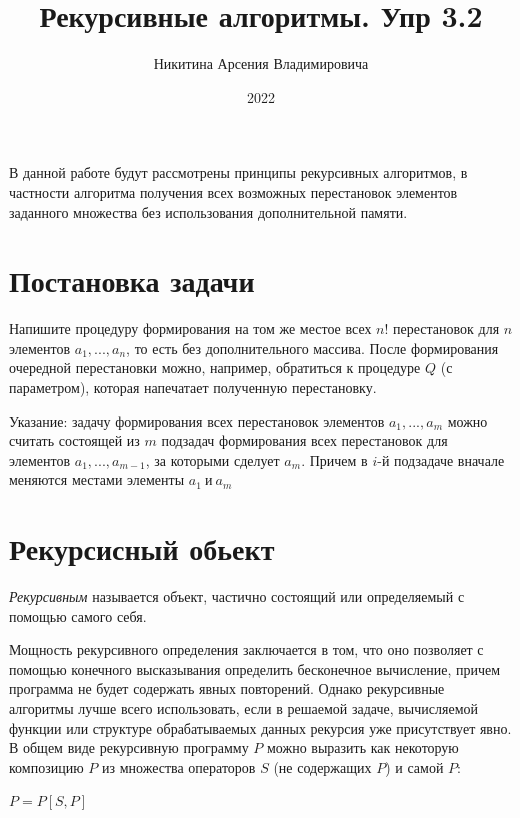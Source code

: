 \documentclass[bachelor, och, labwork]{shiza}
\begin{document}

\title{Рекурсивные алгоритмы. Упр 3.2}





\author{Никитина Арсения Владимировича}



\date{2022}

\maketitle

\tableofcontents

\intro
В данной работе будут рассмотрены принципы рекурсивных алгоритмов, в частности
алгоритма получения всех возможных перестановок элементов заданного множества
без использования дополнительной памяти.

\section{Постановка задачи}
Напишите процедуру формирования на том же местое всех $n!$ перестановок для $n$
элементов $a_1,...,a_n$, то есть без дополнительного массива. После формирования
очередной перестановки можно, например, обратиться к процедуре $Q$ (с параметром),
которая напечатает полученную перестановку.

Указание: задачу формирования всех перестановок элементов $a_1,...,a_m$ можно
считать состоящей из $m$ подзадач формирования всех перестановок для элементов
$a_1,...,a_{m-1}$, за которыми сделует $a_m$. Причем в $i$-й подзадаче вначале
меняются местами элементы $a_1 ~\text{и}~ a_m$

\section{Рекурсисный обьект}

\textit{Рекурсивным} называется объект, частично состоящий или определяемый с
помощью самого себя.

Мощность рекурсивного определения заключается в том, что оно позволяет с помощью
конечного высказывания определить бесконечное вычисление, причем программа не 
будет содержать явных повторений. Однако рекурсивные алгоритмы лучше всего
использовать, если в решаемой задаче, вычисляемой функции или структуре
обрабатываемых данных рекурсия уже присутствует явно. В общем виде рекурсивную
программу $P$ можно выразить как некоторую композицию $P$ из множества
операторов $S$ (не содержащих $P$) и самой $P$:
\begin{center}$P=P[S,P]$\end{center}
\end{document}
